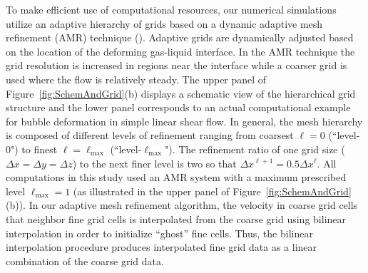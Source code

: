 \documentclass{elsarticle}
\begin{document}
To make efficient use of computational resources, our numerical simulations
utilize an adaptive hierarchy of grids based on a dynamic adaptive mesh
refinement (AMR) technique (\citet{SusAlmBelColHowWel99}).  Adaptive grids are
dynamically adjusted based on the location of the 
deforming gas-liquid interface.
In the AMR technique the grid resolution is increased in regions near the
interface while a coarser grid is used where the flow is relatively steady.
The upper panel of Figure~\ref{fig:SchemAndGrid}(b) displays a schematic view
of the hierarchical grid structure and the lower panel corresponds to an actual
computational example for bubble deformation in simple linear shear flow.  In
general, the mesh hierarchy is composed of different levels of refinement
ranging from coarsest $\ell=0$ (``level-0") to finest
$\ell=\ell_{\textrm{max}}$ (``level-$\ell_{\textrm{max}}$").  The refinement
ratio of one grid size ($\Delta x=\Delta y=\Delta z$) to the next finer level
is two so that $\Delta x^{\ell+1}=0.5\Delta x^{\ell}$.  All computations in
this study used an AMR system with a maximum prescribed level
$\ell_{\textrm{max}} = 1$ (as illustrated in the upper panel of
Figure~\ref{fig:SchemAndGrid}(b)).  In our adaptive mesh refinement algorithm,
the velocity in coarse grid cells that neighbor fine grid cells is interpolated
from the coarse grid using bilinear interpolation in order to initialize
``ghost'' fine cells. Thus, the bilinear interpolation procedure produces
interpolated fine grid data as a linear combination of the coarse grid data. 
\end{document}
